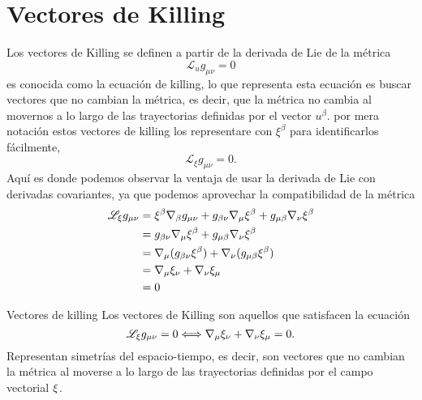 \section{Vectores de Killing}
\noindent Los vectores de Killing se definen a partir de la derivada de Lie de la métrica
\begin{equation}
    \mathscr{L}_u g_{\mu \nu} =0
\end{equation}
es conocida como la ecuación de killing, lo que representa esta ecuación es buscar vectores que no cambian la métrica, es decir, que la métrica no cambia al movernos a lo largo de las trayectorias definidas por el vector $u^\beta$.
por mera notación estos vectores de killing los representare con $\xi ^\beta$ para identificarlos fácilmente,
\begin{equation}
    \mathscr{L}_\xi g_{\mu \nu} =0.
\end{equation}
Aquí es donde podemos observar la ventaja de usar la derivada de Lie con derivadas covariantes, ya que podemos aprovechar la compatibilidad de la métrica
\begin{equation}
    \begin{aligned}
        \mathscr{L}_\xi g_{\mu \nu} & = \xi^\beta \mathbf{\nabla}_\beta g_{\mu \nu} +g_{\beta \nu}\mathbf{\nabla}_\mu \xi^\beta +g_{\mu \beta } \mathbf{\nabla}_\nu \xi^\beta \\
                                    & = g_{\beta \nu}\mathbf{\nabla}_\mu \xi^\beta +g_{\mu \beta } \mathbf{\nabla}_\nu \xi^\beta                                         \\
                                    & = \mathbf{\nabla}_\mu (g_{\beta \nu} \xi^\beta) + \mathbf{\nabla}_\nu (g_{\mu \beta } \xi^\beta)                                   \\
                                    & = \mathbf{\nabla}_\mu  \xi_\nu + \mathbf{\nabla}_\nu \xi_\mu                                                                       \\
                                    & =0                                                                                                                       \\
    \end{aligned}
\end{equation}
\begin{definition}{Vectores de killing}{}
    Los vectores de Killing son aquellos que satisfacen la ecuación
    \begin{equation}
        \mathscr{L}_\xi g_{\mu \nu} =0   \Longleftrightarrow   \mathbf{\nabla}_\mu  \xi_\nu + \mathbf{\nabla}_\nu \xi_\mu
        =0      .
        \label{eq:killing}
    \end{equation}
    Representan simetrías del espacio-tiempo, es decir, son vectores que no cambian la métrica al moverse a lo largo de las trayectorias definidas por el campo vectorial $\mathbf{\xi}$.

\end{definition}
